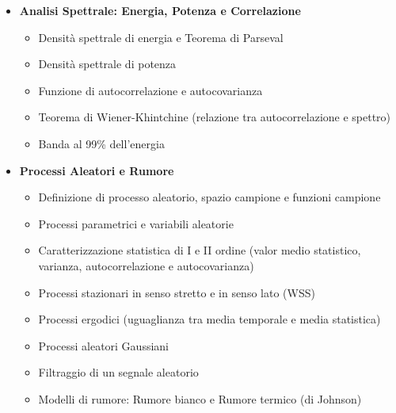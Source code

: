 \begin{itemize}
    \item \textbf{Analisi Spettrale: Energia, Potenza e Correlazione}
          \begin{itemize}
              \item Densità spettrale di energia e Teorema di Parseval
              \item Densità spettrale di potenza
              \item Funzione di autocorrelazione e autocovarianza
              \item Teorema di Wiener-Khintchine (relazione tra autocorrelazione e spettro)
              \item Banda al 99\% dell'energia
          \end{itemize}

    \item \textbf{Processi Aleatori e Rumore}
          \begin{itemize}
              \item Definizione di processo aleatorio, spazio campione e funzioni campione
              \item Processi parametrici e variabili aleatorie
              \item Caratterizzazione statistica di I e II ordine (valor medio statistico, varianza, autocorrelazione e autocovarianza)
              \item Processi stazionari in senso stretto e in senso lato (WSS)
              \item Processi ergodici (uguaglianza tra media temporale e media statistica)
              \item Processi aleatori Gaussiani
              \item Filtraggio di un segnale aleatorio
              \item Modelli di rumore: Rumore bianco e Rumore termico (di Johnson)
          \end{itemize}


\end{itemize}
